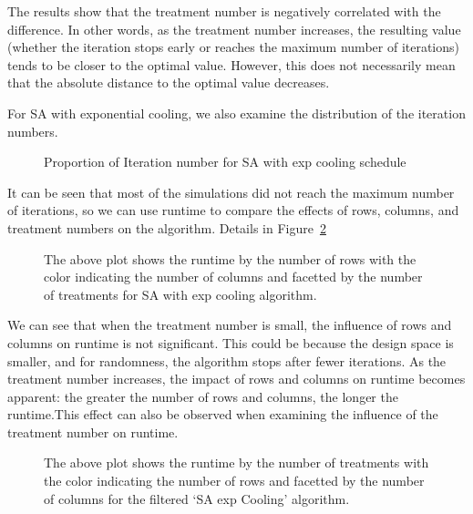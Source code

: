 \documentclass[
  a4paper,
  oneside,
  openany,
  12pt,
  onecolumn]{book}
\theoremstyle{definition}
\theoremstyle{definition}
\theoremstyle{plain}
\theoremstyle{remark}
\begin{document}
The results show that the treatment number is negatively correlated with
the difference. In other words, as the treatment number increases, the
resulting value (whether the iteration stops early or reaches the
maximum number of iterations) tends to be closer to the optimal value.
However, this does not necessarily mean that the absolute distance to
the optimal value decreases.

For SA with exponential cooling, we also examine the distribution of the
iteration numbers.

\begin{figure}


\caption{\label{fig-iteration-ditribution-SAlog}Proportion of Iteration
number for SA with exp cooling schedule}

\end{figure}%

It can be seen that most of the simulations did not reach the maximum
number of iterations, so we can use runtime to compare the effects of
rows, columns, and treatment numbers on the algorithm. Details in
Figure~\ref{fig-RvTSAexp}

\begin{figure}


\caption{\label{fig-RvTSAexp}The above plot shows the runtime by the
number of rows with the color indicating the number of columns and
facetted by the number of treatments for SA with exp cooling algorithm.}

\end{figure}%

We can see that when the treatment number is small, the influence of
rows and columns on runtime is not significant. This could be because
the design space is smaller, and for randomness, the algorithm stops
after fewer iterations. As the treatment number increases, the impact of
rows and columns on runtime becomes apparent: the greater the number of
rows and columns, the longer the runtime.This effect can also be
observed when examining the influence of the treatment number on
runtime.

\begin{figure}


\caption{\label{fig-TvTSAexp}The above plot shows the runtime by the
number of treatments with the color indicating the number of rows and
facetted by the number of columns for the filtered `SA exp Cooling'
algorithm.}

\end{figure}%
\end{document}

